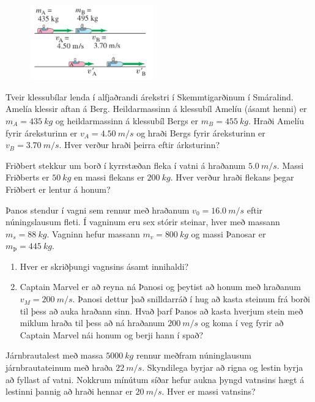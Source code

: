 \ifdefined \wholebook \else\documentclass[oneside]{book}\usepackage{EdlBook}\graphicspath{{figures/}}
\begin{document}
\begin{enumerate}[label = \textbf{Dæmi \thechapter.\arabic*.}]
\begin{minipage}{\linewidth}

\begin{figure}
\centering
\vspace{-1cm}
\includegraphics[width=2.1in]{images/bumber.png}
    \label{fig:bumper}
\end{figure}

\item Tveir klessubílar lenda í alfjaðrandi árekstri í Skemmtigarðinum í Smáralind. Amelía klessir aftan á Berg. Heildarmassinn á klessubíl Amelíu (ásamt henni) er $m_A = \SI{435}{kg}$ og heildarmassinn á klessubíl Bergs er $m_B = \SI{455}{kg}$. Hraði Amelíu fyrir áreksturinn er $v_A = \SI{4.50}{m/s}$ og hraði Bergs fyrir áreksturinn er $v_B = \SI{3.70}{m/s}$. Hver verður hraði þeirra eftir árksturinn? 
\end{minipage}

\item Friðbert stekkur um borð í kyrrstæðan fleka í vatni á hraðanum $\SI{5.0}{m/s}$. Massi Friðberts er $\SI{50}{kg}$ en massi flekans er $\SI{200}{kg}$. Hver verður hraði flekans þegar Friðbert er lentur á honum?

\item Þanos stendur í vagni sem rennur með hraðanum $v_0 = \SI{16.0}{m/s}$ eftir núningslausum fleti. Í vagninum eru sex stórir steinar, hver með massann $m_{s}=\SI{88}{kg}$. Vagninn hefur massann $m_{v}=\SI{800}{kg}$ og massi Þanosar er $m_{\text{Þ}}=\SI{445}{kg}$.
\begin{enumerate}[label = \textbf{(\alph*)}]
    \item Hver er skriðþungi vagnsins ásamt innihaldi?
    \item Captain Marvel er að reyna ná Þanosi og þeytist að honum með hraðanum $v_{M}= \SI{200}{m/s}$. Þanosi dettur það snilldarráð í hug að kasta steinum frá borði til þess að auka hraðann sinn. Hvað þarf Þanos að kasta hverjum stein með miklum hraða til þess að ná hraðanum $\SI{200}{m/s}$ og koma í veg fyrir að Captain Marvel nái honum og berji hann í spað?
\end{enumerate}

\item Járnbrautalest með massa $\SI{5000}{kg}$ rennur meðfram núninglausum járnbrautateinum með hraða $\SI{22}{m/s}$. Skyndilega byrjar að rigna og lestin byrja að fyllast af vatni. Nokkrum mínútum síðar hefur aukna þyngd vatnsins hægt á lestinni þannig að hraði hennar er $\SI{20}{m/s}$. Hver er massi vatnsins?


\end{enumerate}
\end{document}

